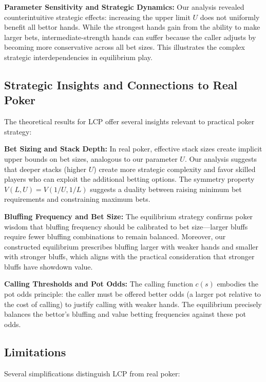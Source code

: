 \documentclass[../../main/main.tex]{subfiles}
\begin{document}
\textbf{Parameter Sensitivity and Strategic Dynamics:} Our analysis revealed counterintuitive strategic effects: increasing the upper limit $U$ does not uniformly benefit all bettor hands. While the strongest hands gain from the ability to make larger bets, intermediate-strength hands can suffer because the caller adjusts by becoming more conservative across all bet sizes. This illustrates the complex strategic interdependencies in equilibrium play.

\subsection{Strategic Insights and Connections to Real Poker}

The theoretical results for LCP offer several insights relevant to practical poker strategy:

\textbf{Bet Sizing and Stack Depth:} In real poker, effective stack sizes create implicit upper bounds on bet sizes, analogous to our parameter $U$. Our analysis suggests that deeper stacks (higher $U$) create more strategic complexity and favor skilled players who can exploit the additional betting options. The symmetry property $V(L,U) = V(1/U, 1/L)$ suggests a duality between raising minimum bet requirements and constraining maximum bets.

\textbf{Bluffing Frequency and Bet Size:} The equilibrium strategy confirms poker wisdom that bluffing frequency should be calibrated to bet size---larger bluffs require fewer bluffing combinations to remain balanced. Moreover, our constructed equilibrium prescribes bluffing larger with weaker hands and smaller with stronger bluffs, which aligns with the practical consideration that stronger bluffs have showdown value.

\textbf{Calling Thresholds and Pot Odds:} The calling function $c(s)$ embodies the pot odds principle: the caller must be offered better odds (a larger pot relative to the cost of calling) to justify calling with weaker hands. The equilibrium precisely balances the bettor's bluffing and value betting frequencies against these pot odds.

\subsection{Limitations}

Several simplifications distinguish LCP from real poker:
\end{document}
